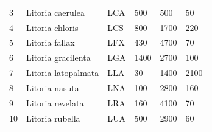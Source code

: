 \begin{table}[htb!]
{\begin{tabular}{llllll}
3         & Litoria caerulea              & LCA                & 500                                                                              & 500                                                                  & 50                                                                               \\ 
4         & Litoria chloris               & LCS                & 800                                                                              & 1700                                                                 & 220                                                                              \\ 
5         & Litoria fallax                & LFX                & 430                                                                              & 4700                                                                 & 70                                                                               \\ 
6         & Litoria gracilenta            & LGA                & 1400                                                                             & 2700                                                                 & 100                                                                              \\ 
7        & Litoria latopalmata           & LLA                & 30                                                                               & 1400                                                                 & 2100                                                                             \\ 
8        & Litoria nasuta                & LNA                & 100                                                                              & 2800                                                                 & 160                                                                              \\ 
9        & Litoria revelata              & LRA                & 160                                                                              & 4100                                                                 & 70                                                                               \\ 
10        & Litoria rubella               & LUA                & 500                                                                              & 2900                                                                 & 60                                                                               \\ 

\end{tabular}}
\end{table}
